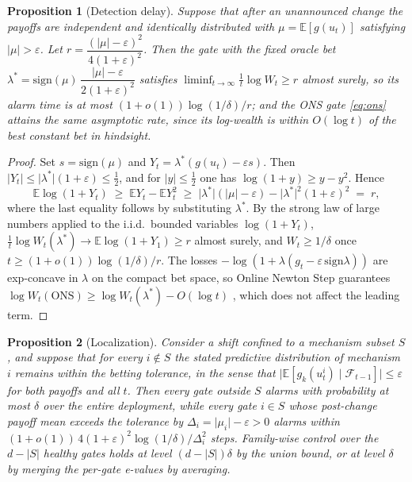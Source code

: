 \documentclass[preprint,12pt]{elsarticle}
\newtheorem{proposition}{Proposition}
\theoremstyle{definition}
\theoremstyle{remark}
\newcommand{\E}{\mathbb{E}}
\begin{document}
\begin{proposition}[Detection delay]\label{prop:delay}
Suppose that after an unannounced change the payoffs are independent and
identically distributed with $\mu=\E[g(u_t)]$ satisfying
$\lvert\mu\rvert>\varepsilon$. Let
$r=\dfrac{(\lvert\mu\rvert-\varepsilon)^2}{4(1+\varepsilon)^2}$. Then the
gate with the fixed oracle bet
$\lambda^\ast=\mathrm{sign}(\mu)\,
\dfrac{\lvert\mu\rvert-\varepsilon}{2(1+\varepsilon)^2}$ satisfies
$\liminf_{t\to\infty}\tfrac1t\log W_t\ge r$ almost surely, so its alarm
time is at most $(1+o(1))\log(1/\delta)/r$; and the ONS gate
\eqref{eq:ons} attains the same asymptotic rate, since its log-wealth is
within $O(\log t)$ of the best constant bet in hindsight.
\end{proposition}

\begin{proof}
Set $s=\mathrm{sign}(\mu)$ and $Y_t=\lambda^\ast(g(u_t)-\varepsilon s)$.
Then $\lvert Y_t\rvert\le\lvert\lambda^\ast\rvert(1+\varepsilon)\le
\tfrac12$, and for $\lvert y\rvert\le\tfrac12$ one has
$\log(1+y)\ge y-y^2$. Hence
\[
\E\log(1+Y_t)\;\ge\;\E Y_t-\E Y_t^2
\;\ge\;\lvert\lambda^\ast\rvert(\lvert\mu\rvert-\varepsilon)
-\lvert\lambda^\ast\rvert^2(1+\varepsilon)^2
\;=\;r,
\]
where the last equality follows by substituting $\lambda^\ast$. By the
strong law of large numbers applied to the i.i.d.\ bounded variables
$\log(1+Y_t)$, $\tfrac1t\log W_t(\lambda^\ast)\to\E\log(1+Y_1)\ge r$
almost surely, and $W_t\ge 1/\delta$ once
$t\ge(1+o(1))\log(1/\delta)/r$. The losses
$-\log(1+\lambda(g_t-\varepsilon\,\mathrm{sign}\lambda))$ are exp-concave
in $\lambda$ on the compact bet space, so Online Newton Step guarantees
$\log W_t(\text{ONS})\ge\log W_t(\lambda^\ast)-O(\log t)$
\citep{hazan2007logarithmic}, which does not affect the leading term.
\end{proof}

\begin{proposition}[Localization]\label{prop:local}
Consider a shift confined to a mechanism subset $S$, and suppose that for
every $i\notin S$ the stated predictive distribution of mechanism $i$
remains within the betting tolerance, in the sense that
$\bigl|\E[g_k(u^i_t)\mid\mathcal{F}_{t-1}]\bigr|\le\varepsilon$ for both
payoffs and all $t$. Then every gate outside $S$ alarms with probability
at most $\delta$ over the entire deployment, while every gate $i\in S$
whose post-change payoff mean exceeds the tolerance by
$\Delta_i=\lvert\mu_i\rvert-\varepsilon>0$ alarms within
$(1+o(1))\,4(1+\varepsilon)^2\log(1/\delta)/\Delta_i^2$ steps. Family-wise
control over the $d-\lvert S\rvert$ healthy gates holds at level
$(d-\lvert S\rvert)\delta$ by the union bound, or at level $\delta$ by
merging the per-gate e-values by averaging.
\end{proposition}
\end{document}
